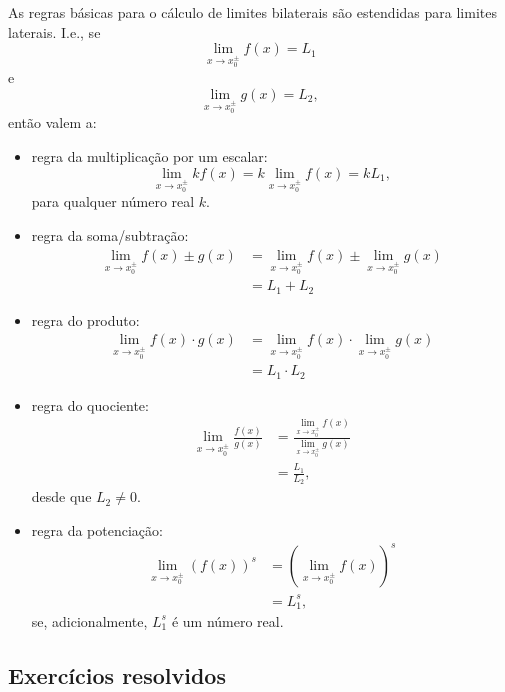 \begin{obs}
  As regras básicas para o cálculo de limites bilaterais são estendidas para limites laterais. I.e., se
  \begin{equation}
    \lim_{x\to x_0^{\pm}} f(x) = L_1
  \end{equation}
  e
  \begin{equation}
    \lim_{x\to x_0^{\pm}} g(x) = L_2,
  \end{equation}
  então valem a:
  \begin{itemize}
\item regra da multiplicação por um escalar:
  \begin{equation}
    \lim_{x\to x_0^{\pm}} kf(x) = k\lim_{x\to x_0^{\pm}} f(x) = kL_1,
  \end{equation}
  para qualquer número real $k$.
\item regra da soma/subtração:
  \begin{align}
    \lim_{x\to x_0^{\pm}} f(x) \pm g(x) &= \lim_{x\to x_0^{\pm}} f(x) \pm \lim_{x\to x_0^{\pm}} g(x)\\
                                        &= L_1 + L_2
  \end{align}
\item regra do produto:
  \begin{align}
    \lim_{x\to x_0^\pm} f(x) \cdot g(x) &= \lim_{x\to x_0^\pm} f(x) \cdot \lim_{x\to x_0^\pm} g(x)\\
                                        &= L_1 \cdot L_2
  \end{align}
\item regra do quociente:
  \begin{align}
    \lim_{x\to x_0^\pm} \frac{f(x)}{g(x)} &= \frac{\lim_{x\to x_0^\pm} f(x)}{\lim_{x\to x_0^\pm} g(x)}\\
                                          &= \frac{L_1}{L_2},
  \end{align}
  desde que $L_2\neq 0$.
\item regra da potenciação:
  \begin{align}
    \lim_{x\to x_0^\pm} (f(x))^s &= \left(\lim_{x\to x_0^\pm} f(x) \right)^s\\
    &= L_1^s,
  \end{align}
  se, adicionalmente, $L_1^s$ é um número real.
\end{itemize}
\end{obs}

\subsection*{Exercícios resolvidos}

